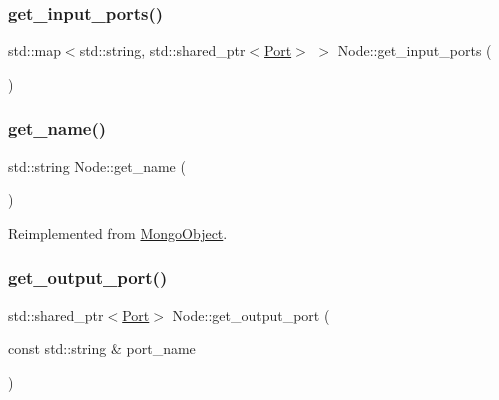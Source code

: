 \subsubsection{\texorpdfstring{get\+\_\+input\+\_\+ports()}{get\_input\_ports()}}
{\footnotesize\ttfamily std\+::map$<$std\+::string, std\+::shared\+\_\+ptr$<$\hyperlink{class_port}{Port}$>$ $>$ Node\+::get\+\_\+input\+\_\+ports (\begin{DoxyParamCaption}{ }\end{DoxyParamCaption})}

\mbox{\label{class_node_a0cc0386322fca056e49e49d869ade853}} 
\subsubsection{\texorpdfstring{get\+\_\+name()}{get\_name()}}
{\footnotesize\ttfamily std\+::string Node\+::get\+\_\+name (\begin{DoxyParamCaption}{ }\end{DoxyParamCaption})\hspace{0.3cm}{\ttfamily [virtual]}}



Reimplemented from \hyperlink{class_mongo_object_abd49d2dcea0ce5f49ebe9a8a9df97164}{Mongo\+Object}.

\mbox{\label{class_node_a98f6937be16c29da2ea37b0ad51cb463}} 
\subsubsection{\texorpdfstring{get\+\_\+output\+\_\+port()}{get\_output\_port()}}
{\footnotesize\ttfamily std\+::shared\+\_\+ptr$<$\hyperlink{class_port}{Port}$>$ Node\+::get\+\_\+output\+\_\+port (\begin{DoxyParamCaption}\item[{const std\+::string \&}]{port\+\_\+name }\end{DoxyParamCaption})}

\mbox{\label{class_node_a060160b85a15190fcf98fa0a3f9ec4e6}} 
